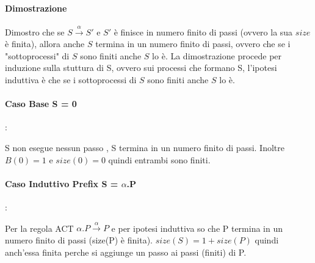 \documentclass{article}
\newcommand{\passo}{\xrightarrow{\alpha}}
\begin{document}
\paragraph{Dimostrazione} %


Dimostro che se $S \passo S'$ e $S'$ è finisce in numero finito di passi (ovvero la sua $size$ è finita), allora anche $S$ termina in un numero finito di passi, ovvero che se i "sottoprocessi" di $S$ sono finiti anche $S$ lo è.
La dimostrazione procede per induzione sulla stuttura di S, ovvero sui processi che formano S, l'ipotesi induttiva è che se i sottoprocessi di $S$ sono finiti anche $S$ lo è.

\paragraph{Caso Base S = 0}: 

S non esegue nessun passo%
, S termina in un numero finito di passi. Inoltre $B(0) = 1$ e $size(0) = 0$ quindi entrambi sono finiti.

\paragraph{Caso Induttivo Prefix S = $\alpha$.P}:

Per la regola ACT $\alpha.P \xrightarrow{\alpha}P$ e per ipotesi induttiva so che P termina in un numero finito di passi (size(P) è finita). $size(S) = 1+ size(P)$ quindi anch'essa finita perche si aggiunge un passo ai passi (finiti) di P.
\end{document}
